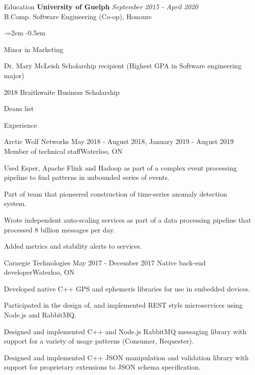 \documentclass{resume}
\begin{document}
  \begin{rSection}{Education}
    {\bf University of Guelph} \hfill {\em September 2015 - April 2020} \\ 
    { B.Comp. Software Engineering (Co-op), Honours } 
    \begin{list}{$\cdot$}{\leftmargin=2em}
    	\itemsep -0.5em \vspace{-0.5em}
    	\item { Minor in Marketing }
    	\item { Dr. Mary McLeish Scholarship recipient (Highest GPA in Software engineering major)} 
    	\item { 2018 Braithwaite Business Scholarship} 
    	\item { Deans list }
    \end{list}
  \end{rSection}

  \begin{rSection}{Experience}
  
    \begin{rSubsection}{Arctic Wolf Networks}
    	{May 2018 - August 2018, January 2019 - August 2019}
    	{Member of technical staff}{Waterloo, ON}
    \item Used Esper, Apache Flink and Hadoop as part of a complex event processing pipeline to find 
    patterns in unbounded series of events.
    \item Part of team that pioneered construction of time-series anomaly detection system.
    \item Wrote independent auto-scaling services as part of a data processing pipeline that processed 8 
    billion messages per day.
    \item Added metrics and stability alerts to services.
    \end{rSubsection}

    \begin{rSubsection}{Carnegie Technologies}
    	{May 2017 - December 2017}
    	{Native back-end developer}{Waterloo, ON}
    \item Developed native C++ GPS and ephemeris libraries for use in embedded devices.
    \item Participated in the design of, and implemented REST style microservices using Node.js and 
    RabbitMQ.
    \item Designed and implemented C++ and Node.js RabbitMQ messaging library with support for a variety 
    of usage patterns (Consumer, Requester).
    \item Designed and implemented C++ JSON manipulation and validation library with support for 
    proprietary extensions to JSON schema specification.
    \end{rSubsection}

  \end{rSection}
\end{document}
